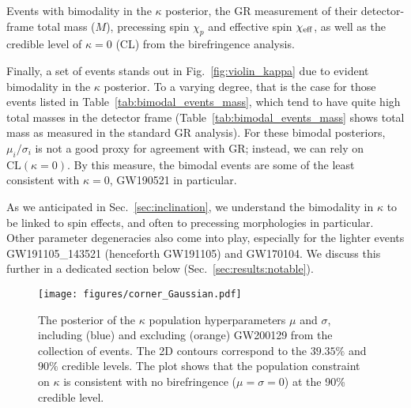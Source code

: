 \documentclass[aps,prd,twocolumn,superscriptaddress,preprintnumbers,nofootinbib]{revtex4-2}
\begin{document}
\begin{table}
    \caption{Events with bimodality in the $\kappa$ posterior, the \ac{GR} measurement of their detector-frame total mass ($M$), precessing spin $\chi_p$ and effective spin $\chi_{\rm eff}$, as well as the credible level of $\kappa = 0$ (CL) from the birefringence analysis.}
    \begin{ruledtabular}
    \end{ruledtabular}
    \label{tab:bimodal_events_mass}
\end{table}

Finally, a set of events stands out in Fig.~\ref{fig:violin_kappa} due to evident bimodality in the $\kappa$ posterior.
To a varying degree, that is the case for those events listed in Table~\ref{tab:bimodal_events_mass}, which tend to have quite high total masses in the detector frame (Table~\ref{tab:bimodal_events_mass} shows total mass as measured in the standard \ac{GR} analysis).
For these bimodal posteriors, $\mu_i/\sigma_i$ is not a good proxy for agreement with \ac{GR}; instead, we can rely on $\mathrm{CL}(\kappa = 0)$.
By this measure, the bimodal events are some of the least consistent with $\kappa = 0$, GW190521 in particular.

As we anticipated in Sec.~\ref{sec:inclination}, we understand the bimodality in $\kappa$ to be linked to spin effects, and often to precessing morphologies in particular.
Other parameter degeneracies also come into play, especially for the lighter events GW191105\_143521 (henceforth GW191105) and GW170104.
We discuss this further in a dedicated section below (Sec.~\ref{sec:results:notable}).

\begin{figure}
    \texttt{[image: figures/corner\_Gaussian.pdf]}
    \caption{
        The posterior of the $\kappa$ population hyperparameters $\mu$ and $\sigma$, including (blue) and excluding (orange) GW200129 from the collection of events.
        The 2D contours correspond to the $39.35\%$ and $90\%$ credible levels.
        The plot shows that the population constraint on $\kappa$ is consistent with no birefringence ($\mu=\sigma=0$) at the 90\% credible level.
    }
    \label{fig:corner_Gaussian}
\end{figure}
\end{document}
